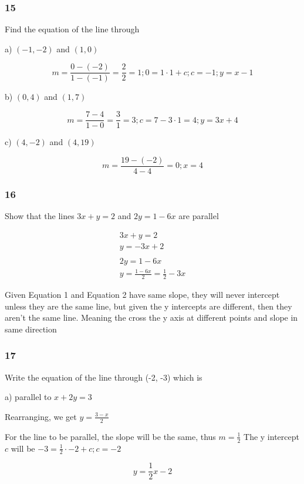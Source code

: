 \documentclass[]{report}
\begin{document}
\subsubsection{15}

Find the equation of the line through

a) $(-1, -2)$ and $(1, 0)$

\[
m = \frac{0 - (-2)}{1 - (-1)} = \frac{2}{2} = 1; 0 = 1 \cdot 1 + c; c = -1; y = x - 1
\]

b) $(0, 4)$ and $(1, 7)$

\[
m = \frac{7 - 4}{1 - 0} = \frac{3}{1} = 3; c = 7 - 3\cdot 1 = 4; y = 3x + 4
\]

c) $(4, -2)$ and $(4, 19)$

\[
m = \frac{19 - (-2)}{4 - 4} = 0; x = 4
\]


\subsubsection{16}

Show that the lines $3x + y = 2$ and $2y = 1- 6x$ are parallel

\begin{align*}
3x + y = 2 \tag{Equation 1}\\
y = -3x + 2 \tag{when rearranged}\\
\\
2y = 1 - 6x \tag{Equation 2}	\\
y = \frac{1 - 6x}{2} = \frac{1}{2} - 3x \tag{when rearranged}
\end{align*}

Given Equation 1 and Equation 2 have same slope, they will never intercept unless they are the same line, but given the y intercepts are different, then they aren't the same line. Meaning the cross the y axis at different points and slope in same direction


\subsubsection{17}

Write the equation of the line through (-2, -3) which is 

a) parallel to $x + 2y = 3$

Rearranging, we get $y = \frac{3 - x}{2}$

For the line to be parallel, the slope will be the same, thus $m=\frac{1}{2}$ The y intercept $c$ will be $-3 = \frac{1}{2}\cdot -2 + c; c=-2$

\[
	y = \frac{1}{2}x -2
\]
\end{document}
